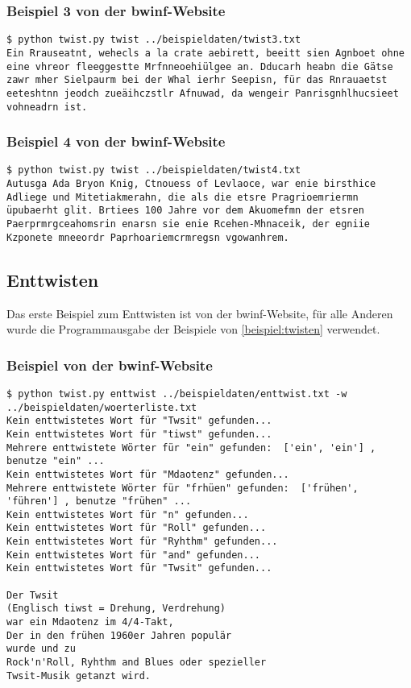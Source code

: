 \documentclass[a4paper,10pt,ngerman]{scrartcl}
\begin{document}
\vspace{10pt}
\subsubsection{Beispiel 3 von der bwinf-Website}
\label{beispiel:twisten:3}
\begin{lstlisting}[breaklines=true]
$ python twist.py twist ../beispieldaten/twist3.txt 
Ein Rrauseatnt, wehecls a la crate aebirett, beeitt sien Agnboet ohne eine vhreor fleeggestte Mrfnneoehiülgee an. Dducarh heabn die Gätse zawr mher Sielpaurm bei der Whal ierhr Seepisn, für das Rnrauaetst eeteshtnn jeodch zueäihczstlr Afnuwad, da wengeir Panrisgnhlhucsieet vohneadrn ist.
\end{lstlisting}

\vspace{10pt}
\subsubsection{Beispiel 4 von der bwinf-Website}
\label{beispiel:twisten:4}
\begin{lstlisting}[breaklines=true]
$ python twist.py twist ../beispieldaten/twist4.txt 
Autusga Ada Bryon Knig, Ctnouess of Levlaoce, war enie birsthice Adliege und Mitetiakmerahn, die als die etsre Pragrioemriermn üpubaerht glit. Brtiees 100 Jahre vor dem Akuomefmn der etsren Paerprmrgceahomsrin enarsn sie enie Rcehen-Mhnaceik, der egniie Kzponete mneeordr Paprhoariemcrmregsn vgowanhrem.
\end{lstlisting}

\subsection{Enttwisten}
Das erste Beispiel zum Enttwisten ist von der bwinf-Website, für alle Anderen wurde die Programmausgabe der Beispiele von \ref{beispiel:twisten} verwendet.

\subsubsection{Beispiel von der bwinf-Website}
\label{beispiel:enttwisten:1}
\begin{lstlisting}[breaklines=true]
  $ python twist.py enttwist ../beispieldaten/enttwist.txt -w ../beispieldaten/woerterliste.txt
Kein enttwistetes Wort für "Twsit" gefunden...
Kein enttwistetes Wort für "tiwst" gefunden...
Mehrere enttwistete Wörter für "ein" gefunden:  ['ein', 'ein'] , benutze "ein" ...
Kein enttwistetes Wort für "Mdaotenz" gefunden...
Mehrere enttwistete Wörter für "frhüen" gefunden:  ['frühen', 'führen'] , benutze "frühen" ...
Kein enttwistetes Wort für "n" gefunden...
Kein enttwistetes Wort für "Roll" gefunden...
Kein enttwistetes Wort für "Ryhthm" gefunden...
Kein enttwistetes Wort für "and" gefunden...
Kein enttwistetes Wort für "Twsit" gefunden...

Der Twsit  
(Englisch tiwst = Drehung, Verdrehung)  
war ein Mdaotenz im 4/4-Takt,  
Der in den frühen 1960er Jahren populär  
wurde und zu  
Rock'n'Roll, Ryhthm and Blues oder spezieller 
Twsit-Musik getanzt wird.
\end{lstlisting}
\end{document}
